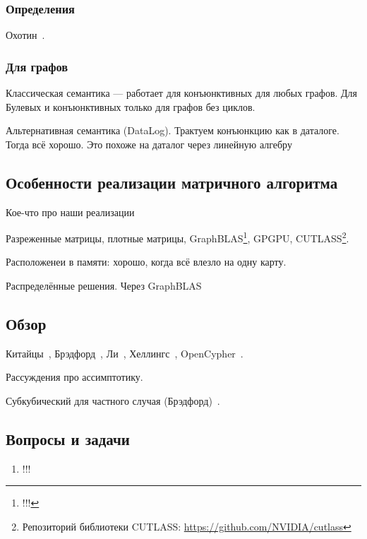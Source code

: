 \subsubsection{Определения}

Охотин~\cite{!!!}.

\subsubsection{Для графов}

Классическая семантика --- работает для конъюнктивных для любых графов.
Для Булевых и конъюнктивных только для графов без циклов.

Альтернативная семантика (DataLog).
Трактуем конъюнкцию как в даталоге. Тогда всё хорошо.
Это похоже на даталог через линейную алгебру~\cite{!!!}

\subsection{Особенности реализации матричного алгоритма}

Кое-что про наши реализации~\cite{Mishin:2019:ECP:3327964.3328503}

Разреженные матрицы, плотные матрицы, GraphBLAS\footnote{!!!}, GPGPU, CUTLASS\footnote{Репозиторий библиотеки CUTLASS: \url{https://github.com/NVIDIA/cutlass}}.

Расположенеи в памяти: хорошо, когда всё влезло на одну карту.

Распределённые решения.
Через GraphBLAS

\subsection{Обзор}

Китайцы~\cite{!!!}, Брэдфорд~\cite{!!!}, Ли~\cite{Lee:2002:FCG:505241.505242}, Хеллингс~\cite{!!!}, OpenCypher~\cite{Kuijpers:2019:ESC:3335783.3335791}.

Рассуждения про ассимптотику.

Субкубический для частного случая (Брэдфорд)~\cite{8249039}.

\subsection{Вопросы и задачи}
\begin{enumerate}
  \item !!!
\end{enumerate}
